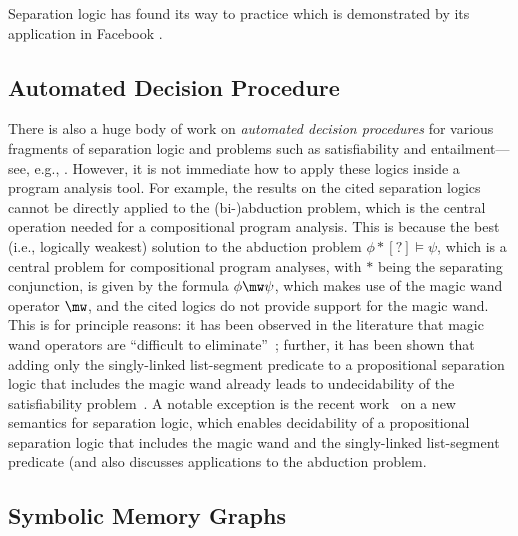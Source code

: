 	  Separation logic has found its way to practice which is demonstrated by its application
	  in Facebook \cite{www:fbinfer}.

	  \subsection{Automated Decision Procedure}
          There is also a huge body of work on \emph{automated decision
          procedures} for various fragments of separation logic and problems such as
          satisfiability and entailment---see, e.g., \cite{enea_compositional_2014, iosif_deciding_2014,
          soa-JensFlorian:BeyondSymHeap:20, soa-LocLe:VMCAI21, soa-Radu:CADE21}.
          However, it is not immediate how to apply these logics inside a program analysis
          tool.
          For example, the results on the cited separation logics cannot be directly
          applied to the \mbox{(bi-)abduction} problem, which is the central operation
          needed for a compositional program analysis.
          This is because the best (i.e., logically weakest) solution to the abduction
          problem $\phi * [?] \models \psi$, which is a central problem for compositional
          program analyses, with $*$ being the separating conjunction, is given by the
          formula $\phi \mw \psi$, which makes use of the magic wand operator $\mw$, and
          the cited logics do not provide support for the magic wand.
          This is for principle reasons: it has been observed in the literature that magic
          wand operators are ``difficult to eliminate''~\cite{soa-books/daglib/0034962};
          further, it has been shown that adding only the singly-linked list-segment
          predicate to a propositional separation logic that includes the magic wand
          already leads to undecidability of the satisfiability
          problem~\cite{soa-conf/fossacs/DemriLM18}.
          A notable exception is the recent work~\cite{soa-conf/esop/PagelZ21} on a new
          semantics for separation logic, which enables decidability of a propositional
          separation logic that includes the magic wand and the singly-linked list-segment
          predicate (and also discusses applications to the abduction problem.

	  \subsection{Symbolic Memory Graphs}

